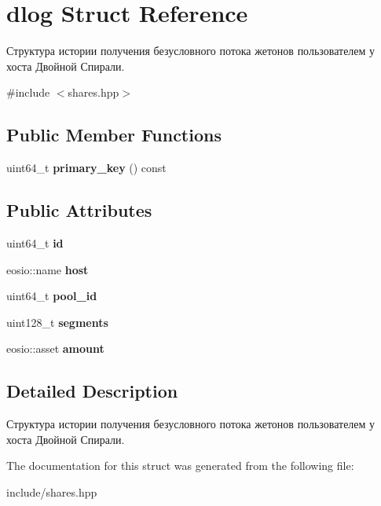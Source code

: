 \hypertarget{structdlog}{}\section{dlog Struct Reference}
\label{structdlog}


Структура истории получения безусловного потока жетонов пользователем у хоста Двойной Спирали.  




{\ttfamily \#include $<$shares.\+hpp$>$}

\subsection*{Public Member Functions}
\begin{DoxyCompactItemize}
\item 
\mbox{\label{structdlog_a475232f214d913d1ce04dc0d78f90a35}} 
uint64\+\_\+t {\bfseries primary\+\_\+key} () const
\end{DoxyCompactItemize}
\subsection*{Public Attributes}
\begin{DoxyCompactItemize}
\item 
\mbox{\label{structdlog_a631b025f45d95a13490dd5c308f3a9d9}} 
uint64\+\_\+t {\bfseries id}
\item 
\mbox{\label{structdlog_a2773a44a4c1f8ea4fbf862afa7e43b25}} 
eosio\+::name {\bfseries host}
\item 
\mbox{\label{structdlog_af12e25c20f606373a8355a30bbf78c79}} 
uint64\+\_\+t {\bfseries pool\+\_\+id}
\item 
\mbox{\label{structdlog_a013dba87b3a6b4aebd044a54b1e63607}} 
uint128\+\_\+t {\bfseries segments}
\item 
\mbox{\label{structdlog_a83cdd3a33e2cdea1831f1a406fbd4e6f}} 
eosio\+::asset {\bfseries amount}
\end{DoxyCompactItemize}


\subsection{Detailed Description}
Структура истории получения безусловного потока жетонов пользователем у хоста Двойной Спирали. 

The documentation for this struct was generated from the following file\+:\begin{DoxyCompactItemize}
\item 
include/shares.\+hpp\end{DoxyCompactItemize}
